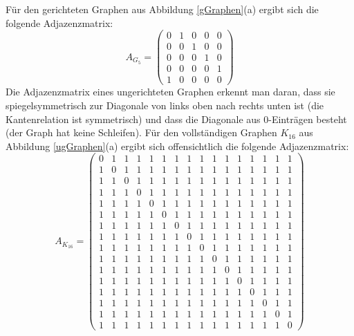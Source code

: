 \begin{example}
Für den gerichteten Graphen aus Abbildung \ref{gGraphen}(a) ergibt sich die
folgende Adjazenzmatrix:
\begin{displaymath}
A_{G_5} =
\left(
\begin{array}{ccccc}
0 & 1 & 0 & 0 & 0\\ 
0 & 0 & 1 & 0 & 0\\
0 & 0 & 0 & 1 & 0\\
0 & 0 & 0 & 0 & 1\\
1 & 0 & 0 & 0 & 0
\end{array}
\right)
\end{displaymath}
Die Adjazenzmatrix eines ungerichteten Graphen erkennt man daran, dass
sie spiegelsymmetrisch zur Diagonale von links oben nach rechts unten
ist (die Kantenrelation ist symmetrisch) und
dass die Diagonale aus $0$-Einträgen besteht (der Graph hat keine
Schleifen). Für den vollständigen Graphen $K_{16}$ aus
Abbildung \ref{ugGraphen}(a) ergibt sich offensichtlich die folgende
Adjazenzmatrix:
\begin{displaymath}
A_{K_{16}} =
\left(
\begin{array}{cccccccccccccccc}
0 & 1 & 1 & 1 & 1 & 1 & 1 & 1 & 1 & 1 & 1 & 1 & 1 & 1 & 1 & 1\\ 
1 & 0 & 1 & 1 & 1 & 1 & 1 & 1 & 1 & 1 & 1 & 1 & 1 & 1 & 1 & 1\\ 
1 & 1 & 0 & 1 & 1 & 1 & 1 & 1 & 1 & 1 & 1 & 1 & 1 & 1 & 1 & 1\\ 
1 & 1 & 1 & 0 & 1 & 1 & 1 & 1 & 1 & 1 & 1 & 1 & 1 & 1 & 1 & 1\\ 
1 & 1 & 1 & 1 & 0 & 1 & 1 & 1 & 1 & 1 & 1 & 1 & 1 & 1 & 1 & 1\\ 
1 & 1 & 1 & 1 & 1 & 0 & 1 & 1 & 1 & 1 & 1 & 1 & 1 & 1 & 1 & 1\\ 
1 & 1 & 1 & 1 & 1 & 1 & 0 & 1 & 1 & 1 & 1 & 1 & 1 & 1 & 1 & 1\\ 
1 & 1 & 1 & 1 & 1 & 1 & 1 & 0 & 1 & 1 & 1 & 1 & 1 & 1 & 1 & 1\\ 
1 & 1 & 1 & 1 & 1 & 1 & 1 & 1 & 0 & 1 & 1 & 1 & 1 & 1 & 1 & 1\\ 
1 & 1 & 1 & 1 & 1 & 1 & 1 & 1 & 1 & 0 & 1 & 1 & 1 & 1 & 1 & 1\\ 
1 & 1 & 1 & 1 & 1 & 1 & 1 & 1 & 1 & 1 & 0 & 1 & 1 & 1 & 1 & 1\\ 
1 & 1 & 1 & 1 & 1 & 1 & 1 & 1 & 1 & 1 & 1 & 0 & 1 & 1 & 1 & 1\\ 
1 & 1 & 1 & 1 & 1 & 1 & 1 & 1 & 1 & 1 & 1 & 1 & 0 & 1 & 1 & 1\\ 
1 & 1 & 1 & 1 & 1 & 1 & 1 & 1 & 1 & 1 & 1 & 1 & 1 & 0 & 1 & 1\\ 
1 & 1 & 1 & 1 & 1 & 1 & 1 & 1 & 1 & 1 & 1 & 1 & 1 & 1 & 0 & 1\\ 
1 & 1 & 1 & 1 & 1 & 1 & 1 & 1 & 1 & 1 & 1 & 1 & 1 & 1 & 1 & 0
\end{array}
\right)
\end{displaymath}
\end{example}
